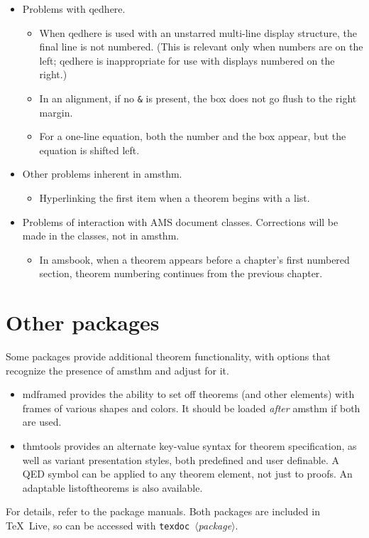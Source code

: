 \documentclass[11pt,twoside]{article}
\newcommand{\ntt}{%
  \fontfamily\ttdefault \fontseries\mddefault \fontshape\updefault
  \selectfont
}
\DeclareRobustCommand{\cn}[1]{{\ntt\bslchar#1}}
\DeclareRobustCommand{\cls}[1]{{\ntt#1}}
\DeclareRobustCommand{\pkg}[1]{{\ntt#1}}
\def\<#1>{{\normalfont$\langle$\textit{#1}$\rangle$}}
\begin{document}
\begin{itemize}
\item Problems with \cn{qedhere}. %
 \begin{itemize}
  \item When \cn{qedhere} is used with an unstarred multi-line display
    structure, the final line is not numbered.  (This is relevant only
    when numbers are on the left; \cn{qedhere} is inappropriate for
    use with displays numbered on the right.)
  \item In an alignment, if no \verb+&+ is present, the box does not
    go flush to the right margin.
  \item For a one-line equation, both the number and the box appear,
    but the equation is shifted left.
 \end{itemize}
\item Other problems inherent in \pkg{amsthm}.
 \begin{itemize}
  \item Hyperlinking the first item when a theorem begins with a list.
 \end{itemize}
\item Problems of interaction with AMS document classes.  Corrections
  will be made in the classes, not in \pkg{amsthm}.
 \begin{itemize}
  \item In \cls{amsbook}, when a theorem appears before a chapter's
    first numbered section, theorem numbering continues from the
    previous chapter.
 \end{itemize}
\end{itemize}


\section{Other packages}

Some packages provide additional theorem functionality, with options
that recognize the presence of \pkg{amsthm} and adjust for it.
\begin{itemize}
\itemsep=.5\itemsep
\item \pkg{mdframed} \cite{MDF} provides the ability to set off theorems
  (and other elements) with frames of various shapes and colors.
  It should be loaded \emph{after} \pkg{amsthm} if both are used.
\item \pkg{thmtools} \cite{THT} provides an alternate key-value syntax
  for theorem specification, as well as variant presentation styles,
  both predefined and user definable.  A QED symbol can be applied to any
  theorem element, not just to proofs.  An adaptable \cn{listoftheorems}
  is also available.
\end{itemize}
For details, refer to the package manuals.  Both packages are included
in \TeX~Live, so can be accessed with
\texttt{texdoc}~\<package>.
\end{document}
